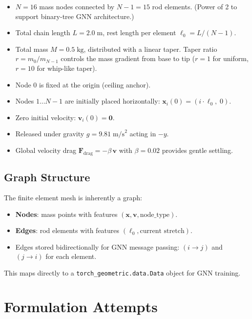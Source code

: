 \documentclass[11pt,a4paper]{article}
\begin{document}
\begin{itemize}
    \item $N = 16$ mass nodes connected by $N-1 = 15$ rod elements.
          (Power of 2 to support binary-tree GNN architecture.)
    \item Total chain length $L = 2.0\;\text{m}$, rest length per element
          $\ell_0 = L/(N-1)$.
    \item Total mass $M = 0.5\;\text{kg}$, distributed with a linear taper.
          Taper ratio $r = m_0 / m_{N-1}$ controls the mass gradient from
          base to tip ($r = 1$ for uniform, $r = 10$ for whip-like taper).
    \item Node 0 is fixed at the origin (ceiling anchor).
    \item Nodes $1 \ldots N-1$ are initially placed horizontally:
          $\mathbf{x}_i(0) = (i \cdot \ell_0,\; 0)$.
    \item Zero initial velocity: $\mathbf{v}_i(0) = \mathbf{0}$.
    \item Released under gravity $g = 9.81\;\text{m/s}^2$ acting in $-y$.
    \item Global velocity drag $\mathbf{F}_{\text{drag}} = -\beta\,\mathbf{v}$
          with $\beta = 0.02$ provides gentle settling.
\end{itemize}

\subsection{Graph Structure}

The finite element mesh is inherently a graph:
\begin{itemize}
    \item \textbf{Nodes}: mass points with features
          $(\mathbf{x}, \mathbf{v}, \text{node\_type})$.
    \item \textbf{Edges}: rod elements with features
          $(\ell_0, \text{current stretch})$.
    \item Edges stored bidirectionally for GNN message passing:
          $(i \to j)$ and $(j \to i)$ for each element.
\end{itemize}

This maps directly to a \texttt{torch\_geometric.data.Data} object for GNN
training.

\section{Formulation Attempts}
\label{sec:formulations}
\end{document}
